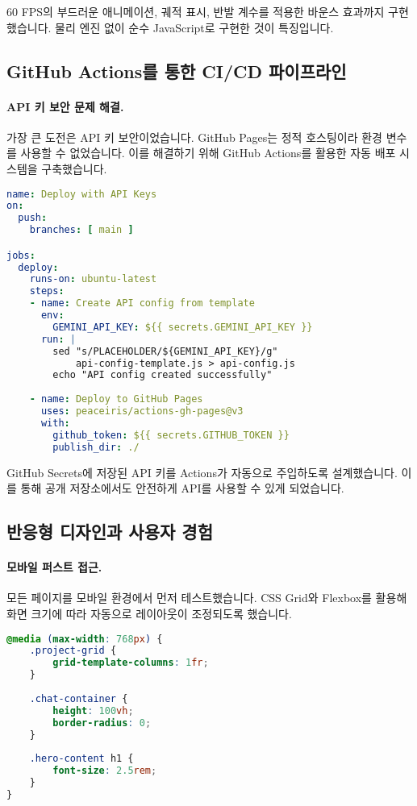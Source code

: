 60 FPS의 부드러운 애니메이션, 궤적 표시, 반발 계수를 적용한 바운스 효과까지 구현했습니다. 물리 엔진 없이 순수 JavaScript로 구현한 것이 특징입니다.

\subsection{GitHub Actions를 통한 CI/CD 파이프라인}

\paragraph{API 키 보안 문제 해결.}
가장 큰 도전은 API 키 보안이었습니다. GitHub Pages는 정적 호스팅이라 환경 변수를 사용할 수 없었습니다. 이를 해결하기 위해 GitHub Actions를 활용한 자동 배포 시스템을 구축했습니다.

\begin{lstlisting}[language=yaml]
name: Deploy with API Keys
on:
  push:
    branches: [ main ]

jobs:
  deploy:
    runs-on: ubuntu-latest
    steps:
    - name: Create API config from template
      env:
        GEMINI_API_KEY: ${{ secrets.GEMINI_API_KEY }}
      run: |
        sed "s/PLACEHOLDER/${GEMINI_API_KEY}/g" 
            api-config-template.js > api-config.js
        echo "API config created successfully"
    
    - name: Deploy to GitHub Pages
      uses: peaceiris/actions-gh-pages@v3
      with:
        github_token: ${{ secrets.GITHUB_TOKEN }}
        publish_dir: ./
\end{lstlisting}

GitHub Secrets에 저장된 API 키를 Actions가 자동으로 주입하도록 설계했습니다. 이를 통해 공개 저장소에서도 안전하게 API를 사용할 수 있게 되었습니다.

\subsection{반응형 디자인과 사용자 경험}

\paragraph{모바일 퍼스트 접근.}
모든 페이지를 모바일 환경에서 먼저 테스트했습니다. CSS Grid와 Flexbox를 활용해 화면 크기에 따라 자동으로 레이아웃이 조정되도록 했습니다.

\begin{lstlisting}[language=css]
@media (max-width: 768px) {
    .project-grid {
        grid-template-columns: 1fr;
    }
    
    .chat-container {
        height: 100vh;
        border-radius: 0;
    }
    
    .hero-content h1 {
        font-size: 2.5rem;
    }
}
\end{lstlisting}

